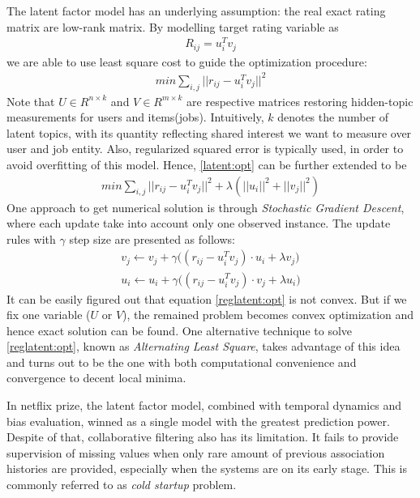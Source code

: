 \documentclass{article} %
\begin{document}


The latent factor model has an underlying assumption: the real exact rating matrix are
low-rank matrix. By modelling target rating variable as 
\begin{align}
    R_{ij} = u_i^T v_j 
\end{align}
we are able to use least square cost to guide the optimization procedure: 
\begin{align} \label{latent:opt}
    min \sum_{i,j} || r_{ij} - u_i^T v_j ||^2 
\end{align}
Note that $U \in R^{n\times k}$ and $V \in R^{m\times k}$ are respective matrices
restoring hidden-topic measurements for users and items(jobs). Intuitively,
$k$ denotes the number of latent topics, with its quantity reflecting shared
interest we want to measure over user and job entity. Also, regularized
squared error is typically used, in order to avoid overfitting of this model.
Hence, \ref{latent:opt} can be further extended to be 
\begin{align} \label{reglatent:opt}
    min \sum_{i,j} || r_{ij} - u_i^T v_j ||^2 + \lambda(||u_i||^2 + ||v_j||^2) 
\end{align}
One approach to get numerical solution is through {\it Stochastic Gradient
    Descent}, where each update take into account only one observed instance.
The update rules with $\gamma$ step size are presented as follows: 
\begin{align}
    v_j \leftarrow v_j + \gamma \big( (r_{ij}-u_i^T v_j)\cdot u_i + \lambda
    v_j \big) \\
    u_i \leftarrow u_i + \gamma \big( (r_{ij}-u_i^T v_j)\cdot v_j + \lambda
    u_i \big)
\end{align}
It can be easily figured out that equation \ref{reglatent:opt} is not convex.
But if we fix one variable ($U$ or $V$), the remained problem becomes convex
optimization and hence exact solution can be found. 
One alternative technique to solve \ref{reglatent:opt}, known as {\it Alternating
    Least Square}, takes advantage of this idea and turns out to be the one with
both computational convenience and convergence to decent local minima.

In netflix prize, the latent factor model, combined with temporal dynamics and
bias evaluation, winned as a single model with the greatest prediction power.
Despite of that, collaborative filtering also has its limitation. It fails to
provide supervision of missing values when only rare amount of previous
association histories are provided, especially when the systems are on its
early stage.  This is commonly referred to as {\it cold startup} problem.
\end{document}
